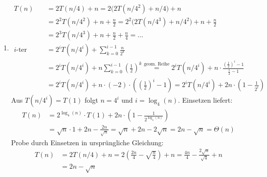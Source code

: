 \documentclass[11pt,a4paper]{article}
\begin{document}
\begin{loesung}
\begin{enumerate}
\begin{enumerate}[label=\roman*)]
        \item
        \begin{align*}
            T(n) &= 2T(n / 4) + n = 2\big(2T(n / 4^2) + n / 4\big) + n \\
            &= 2^2T(n / 4^2) + n + \frac{n}{2} = 2^2\big(2T(n / 4^3) + n / 4^2\big) + n + \frac{n}{2}\\
            &= 2^3T(n / 4^3) + n + \frac{n}{2} + \frac{n}{4} = \ldots \\
            \text{$i$-ter Schritt: } &= 2^i T(n / 4^i) + \sum\limits_{k = 0}^{i - 1} \frac{n}{2^k} \\
            &= 2^i T(n / 4^i) + n \sum\limits_{k = 0}^{i - 1} \left(\frac{1}{2}\right)^k
            \overset{\text{geom. Reihe}}{=} 2^i T(n / 4^i) + n \cdot \frac{\left(\frac{1}{2}\right)^i - 1}{\frac{1}{2} - 1} \\
            &= 2^i T(n / 4^i) + n \cdot (-2) \cdot \left(\left(\frac{1}{2}\right)^i - 1\right)
            = 2^i T(n / 4^i) + 2n \cdot \left(1 - \frac{1}{2^i}\right)
        \end{align*}
        Aus $T(n / 4^i) = T(1)$ folgt $n = 4^i$ und $i = \log_4(n)$. Einsetzen liefert:
        \begin{align*}
            T(n) &= 2^{\log_4(n)} \cdot T(1) + 2n \cdot \left(1 - \frac{1}{2^{\log_4(n)}}\right) \\
            &= \sqrt{n} \cdot 1 + 2n - \frac{2n}{\sqrt{n}} = \sqrt{n} + 2n - 2\sqrt{n}
            = 2n - \sqrt{n} = \Theta(n)
        \end{align*}
        Probe durch Einsetzen in ursprüngliche Gleichung:
        \begin{align*}
            T(n) &= 2T(n / 4) + n = 2\left(\frac{2n}{4} - \sqrt{\frac{n}{4}}\right) + n
            = \frac{4n}{4} - \frac{2\sqrt{n}}{\sqrt{4}} + n \\
            &= 2n - \sqrt{n}
        \end{align*}
    \end{enumerate}


\end{enumerate}
\end{loesung}
\end{document}

